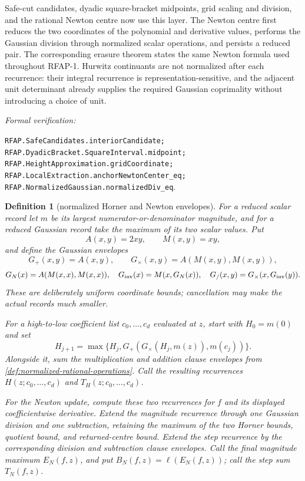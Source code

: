 \documentclass[11pt]{article}
\newtheorem{definition}[definition]{Definition}
\newcommand{\leanref}[1]{\par\smallskip\noindent
  \emph{Formal verification:}\par\nobreak
  {\raggedright\nolinkurl{#1}.\par}}
\begin{document}
Safe-cut candidates, dyadic square-bracket midpoints, grid scaling and
division, and the rational Newton centre now use this layer.  The Newton
centre first reduces the two coordinates of the polynomial and derivative
values, performs the Gaussian division through normalized scalar operations,
and persists a reduced pair.  The corresponding erasure theorem states the
same Newton formula used throughout RFAP-1.  Hurwitz continuants are not
normalized after each recurrence: their integral recurrence is
representation-sensitive, and the adjacent unit determinant already supplies
the required Gaussian coprimality without introducing a choice of unit.

\leanref{RFAP.SafeCandidates.interiorCandidate;
RFAP.DyadicBracket.SquareInterval.midpoint;
RFAP.HeightApproximation.gridCoordinate;
RFAP.LocalExtraction.anchorNewtonCenter_eq;
RFAP.NormalizedGaussian.normalizedDiv_eq}

\begin{definition}[normalized Horner and Newton envelopes]
\label{def:normalized-horner-envelope}
For a reduced scalar record let $m$ be its largest numerator-or-denominator
magnitude, and for a reduced Gaussian record take the maximum of its two
scalar values.  Put
\[
 A(x,y)=2xy,\qquad M(x,y)=xy,
\]
and define the Gaussian envelopes
\[
 G_+(x,y)=A(x,y),\qquad
 G_\times(x,y)=A(M(x,y),M(x,y)),
\]
\[
 G_N(x)=A(M(x,x),M(x,x)),\quad
 G_{\rm inv}(x)=M(x,G_N(x)),\quad
 G_{/}(x,y)=G_\times(x,G_{\rm inv}(y)).
\]
These are deliberately uniform coordinate bounds; cancellation may make the
actual records much smaller.

For a high-to-low coefficient list $c_0,\ldots,c_d$ evaluated at $z$, start
with $H_0=m(0)$ and set
\[
 H_{j+1}=\max\{H_j,
   G_+(G_\times(H_j,m(z)),m(c_j))\}.
\]
Alongside it, sum the multiplication and addition clause envelopes from
\cref{def:normalized-rational-operations}.  Call the resulting recurrences
$H(z;c_0,\ldots,c_d)$ and $T_H(z;c_0,\ldots,c_d)$.

For the Newton update, compute these two recurrences for $f$ and its displayed
coefficientwise derivative.  Extend the magnitude recurrence through one
Gaussian division and one subtraction, retaining the maximum of the two
Horner bounds, quotient bound, and returned-centre bound.  Extend the step
recurrence by the corresponding division and subtraction clause envelopes.
Call the final magnitude maximum $E_N(f,z)$, and put
$B_N(f,z)=\ell(E_N(f,z))$; call the step sum $T_N(f,z)$.
\end{definition}
\end{document}
